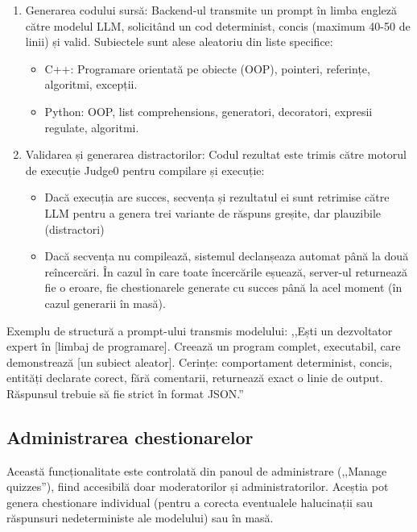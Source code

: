 \begin{enumerate}
    \item Generarea codului sursă: Backend-ul transmite un prompt în limba engleză către modelul LLM, solicitând un cod determinist, concis (maximum 40-50 de linii) și valid. Subiectele sunt alese aleatoriu din liste specifice:
    \begin{itemize}
        \item C++: Programare orientată pe obiecte (OOP), pointeri, referințe, algoritmi, excepții. 
        \item Python: OOP, list comprehensions, generatori, decoratori, expresii regulate, algoritmi.
    \end{itemize}
    \item Validarea și generarea distractorilor: Codul rezultat este trimis către motorul de execuție Judge0 pentru compilare și execuție:
    \begin{itemize}
        \item Dacă execuția are succes, secvența și rezultatul ei sunt retrimise către LLM pentru a genera trei variante de răspuns greșite, dar plauzibile (distractori)
        \item Dacă secvența nu compilează, sistemul declanșeaza automat până la două reîncercări. În cazul în care toate încercările eșuează, server-ul returnează fie o eroare, fie chestionarele generate cu succes până la acel moment (în cazul generarii în masă).
    \end{itemize}
\end{enumerate}

Exemplu de structură a prompt-ului transmis modelului: ,,Ești un dezvoltator expert în [limbaj de programare]. Creează un program complet, executabil, care demonstrează [un subiect aleator]. Cerințe: comportament determinist, concis, entități declarate corect, fără comentarii, returnează exact o linie de output. Răspunsul trebuie să fie strict în format JSON.''

\subsection{Administrarea chestionarelor}

Această funcționalitate este controlată din panoul de administrare (,,Manage quizzes''), fiind accesibilă doar moderatorilor și administratorilor. Aceștia pot genera chestionare individual (pentru a corecta eventualele halucinații sau răspunsuri nedeterministe ale modelului) sau în masă. 

